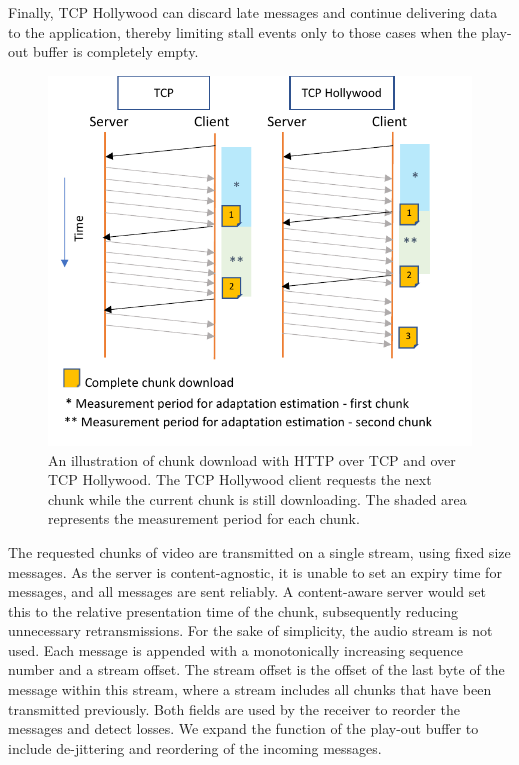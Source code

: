 Finally, TCP Hollywood can discard late messages and continue delivering data to the application, thereby limiting stall events only to those cases when the play-out buffer is completely
empty.

\begin{figure}
    \centering
    \includegraphics[width=\columnwidth]{figures/tcph-download.pdf}
    \caption{An illustration of chunk download with HTTP over TCP and over TCP Hollywood. The TCP Hollywood client requests the next chunk while the current chunk is still downloading. The shaded area represents the measurement period for each chunk. }
    \label{fig:hollywood_download}
\end{figure}

The requested chunks of video are transmitted on a single stream, using fixed size
messages. As the server is content-agnostic, it is unable to set an expiry time for messages, and
all messages are sent reliably. A content-aware server would set this to the relative presentation time of the chunk, subsequently reducing unnecessary retransmissions. For the sake of simplicity, the audio stream is not used. Each message is appended with a monotonically increasing sequence number and a stream offset. The stream offset is the offset of the last byte of the message within this stream, where a stream includes all chunks that have been transmitted
previously. Both fields are used by the receiver to reorder the messages and detect
losses. We expand the function of the play-out buffer to include de-jittering and
reordering of the incoming messages.

